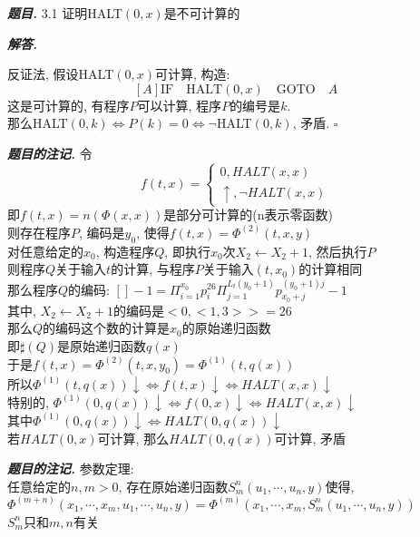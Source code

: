 \documentclass[10pt, a4paper, oneside]{ctexart}
\newenvironment{problem}{\begin{framed}\par\noindent\textbf{\textit{题目. }}}{\end{framed}\par}
\newenvironment{solution}{%
  \par\noindent\textbf{\textit{解答. }}\ignorespaces
}{%
  \hfill\ensuremath{\square}\par
}
\newenvironment{note}{\par\noindent\textbf{\textit{题目的注记. }}\ignorespaces}{\par}
\begin{document}
\begin{problem}
    3.1 证明HALT$(0,x)$是不可计算的
\end{problem}
\begin{solution}
反证法, 假设HALT$(0,x)$可计算, 构造:
$$[A] \text{IF} \quad  \text{HALT}(0,x) \quad \text{GOTO} \quad A $$
这是可计算的, 有程序$P$可以计算, 程序$P$的编号是$k$.\\
那么HALT$(0,k) \iff P(k)=0 \iff \neg $HALT$(0,k)$, 矛盾.
\end{solution}


\begin{note}
    令
    $$f(t,x)=\begin{cases}
        0, HALT(x,x)\\
        \uparrow, \neg HALT(x,x)
    \end{cases} $$
    即$f(t,x)=n(\Phi(x,x)) $是部分可计算的(n表示零函数)\\
    则存在程序$P$, 编码是$y_0$, 使得$f(t,x)=\Phi^{(2)}(t,x,y)$\\
    对任意给定的$x_0$, 构造程序$Q$, 即执行$x_0$次$X_2\leftarrow X_2+1$, 然后执行$P$\\
    则程序$Q$关于输入$t$的计算, 与程序$P$关于输入$(t,x_0)$的计算相同\\
    那么程序$Q$的编码: $[]-1=\Pi_{i=1}^{x_0} p_{i}^{26} \Pi_{j=1}^{L_{t}(y_0+1)}p_{x_0+j}^{(y_0+1)j}-1$\\
    其中, $X_2\leftarrow X_2+1$的编码是$<0,<1,3>>=26$\\
    那么$Q$的编码这个数的计算是$x_0$的原始递归函数\\
    即$\sharp (Q)$是原始递归函数$q(x)$\\
    于是$f(t,x)=\Phi^{(2)}(t,x,y_0)=\Phi^{(1)}(t,q(x))$\\
    所以$\Phi^{(1)}(t,q(x))\downarrow \iff f(t,x) \downarrow \iff HALT(x,x)\downarrow$\\
    特别的, $\Phi^{(1)}(0,q(x))\downarrow \iff f(0,x) \downarrow \iff HALT(x,x)\downarrow$\\
    其中$\Phi^{(1)}(0,q(x))\downarrow \iff HALT(0,q(x))\downarrow$\\
    若$HALT(0,x)$可计算, 那么$HALT(0,q(x))$可计算, 矛盾
\end{note}


\begin{note}
参数定理:\\
任意给定的$n,m>0$, 存在原始递归函数$S_{m}^{n}(u_1,\cdots,u_n,y)$使得, $\Phi^{(m+n)}(x_1,\cdots,x_m,u_1,\cdots,u_n,y)=\Phi^{(m)}(x_1,\cdots,x_m,S_{m}^{n}(u_1,\cdots,u_n,y))$\\
$S_{m}^{n}$只和$m,n$有关
\end{note}
\end{document}
